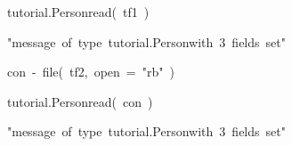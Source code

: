 \documentclass[10pt,twocolumn,a4paper]{article}
\newenvironment{Hinput}%
{}%
{}%
\newenvironment{Houtput}%
{}%
{}%
\newenvironment{Hchunk}%
{\vspace{0.5em}\par\begin{flushleft}}%
{\end{flushleft}}%
\newcommand{\hlstd}[1]{\textcolor[rgb]{0,0,0}{#1}}%
\newcommand{\hlfunctioncall}[1]{\textcolor[rgb]{1,0,0}{#1}}%
\newcommand{\hlstring}[1]{\textcolor[rgb]{0.6,0.6,1}{#1}}%
\newcommand{\hlkeyword}[1]{\textcolor[rgb]{0,0,0}{#1}}%
\newcommand{\hlargument}[1]{\textcolor[rgb]{0.694117647058824,0.247058823529412,0.0196078431372549}{#1}}%
\newcommand{\hlassignement}[1]{\textcolor[rgb]{0.215686274509804,0.215686274509804,0.384313725490196}{#1}}%
\newcommand{\hlsymbol}[1]{\textcolor[rgb]{0,0,0}{#1}}%
\newcommand{\hlprompt}[1]{\textcolor[rgb]{0,0,0}{#1}}%
\begin{document}
\begin{Hchunk}
\begin{normalsize}
\begin{Hinput}

\ttfamily\noindent
\hlprompt{\usebox{\hlnormalsizeboxgreaterthan}{\ }}\hlsymbol{tutorial.Person}\hlkeyword{\usebox{\hlnormalsizeboxdollar}}\hlfunctioncall{read}\hlkeyword{(}{\ }\hlsymbol{tf1}{\ }\hlkeyword{)}\mbox{}
\normalfont

\end{Hinput}

\begin{Houtput}

\ttfamily\noindent
[1]{\ }"{}message{\ }of{\ }type{\ }\usebox{\hlnormalsizeboxsinglequote}tutorial.Person\usebox{\hlnormalsizeboxsinglequote}{\ }with{\ }3{\ }fields{\ }set"{}\hspace*{\fill}\hlstd{}\mbox{}
\normalfont

\end{Houtput}

\begin{Hinput}

\ttfamily\noindent
\hlprompt{\usebox{\hlnormalsizeboxgreaterthan}{\ }}\hlsymbol{con}{\ }\hlassignement{\usebox{\hlnormalsizeboxlessthan}-}{\ }\hlfunctioncall{file}\hlkeyword{(}{\ }\hlsymbol{tf2}\hlkeyword{,}{\ }\hlargument{open}{\ }\hlargument{=}{\ }\hlstring{"{}rb"{}}{\ }\hlkeyword{)}\mbox{}
\normalfont

\end{Hinput}


\begin{Hinput}

\ttfamily\noindent
\hlprompt{\usebox{\hlnormalsizeboxgreaterthan}{\ }}\hlsymbol{tutorial.Person}\hlkeyword{\usebox{\hlnormalsizeboxdollar}}\hlfunctioncall{read}\hlkeyword{(}{\ }\hlsymbol{con}{\ }\hlkeyword{)}\mbox{}
\normalfont

\end{Hinput}

\begin{Houtput}

\ttfamily\noindent
[1]{\ }"{}message{\ }of{\ }type{\ }\usebox{\hlnormalsizeboxsinglequote}tutorial.Person\usebox{\hlnormalsizeboxsinglequote}{\ }with{\ }3{\ }fields{\ }set"{}\hspace*{\fill}\hlstd{}\mbox{}
\normalfont

\end{Houtput}

\end{normalsize}
\end{Hchunk}
\end{document}
